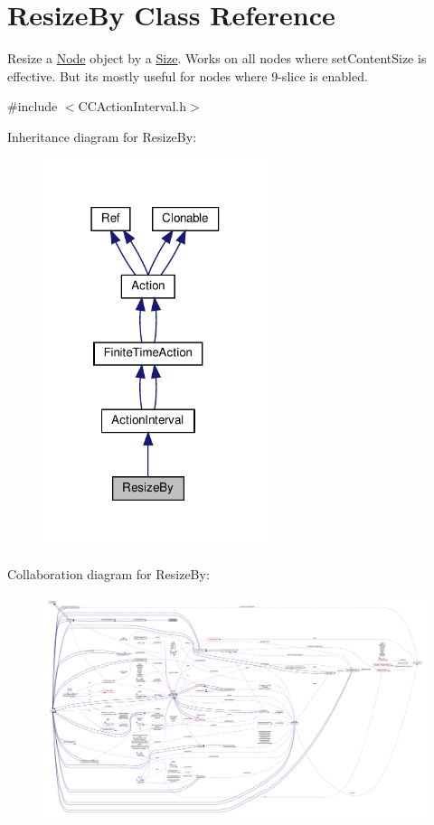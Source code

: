\hypertarget{classResizeBy}{}\section{Resize\+By Class Reference}
\label{classResizeBy}


Resize a \hyperlink{classNode}{Node} object by a \hyperlink{classSize}{Size}. Works on all nodes where set\+Content\+Size is effective. But it\textquotesingle{}s mostly useful for nodes where 9-\/slice is enabled.  




{\ttfamily \#include $<$C\+C\+Action\+Interval.\+h$>$}



Inheritance diagram for Resize\+By\+:
\nopagebreak
\begin{figure}[H]
\begin{center}
\leavevmode
\includegraphics[width=186pt]{classResizeBy__inherit__graph}
\end{center}
\end{figure}


Collaboration diagram for Resize\+By\+:
\nopagebreak
\begin{figure}[H]
\begin{center}
\leavevmode
\includegraphics[width=350pt]{classResizeBy__coll__graph}
\end{center}
\end{figure}
